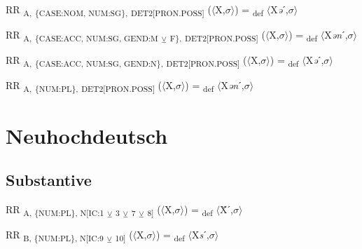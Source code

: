 {\begin{exe}
 RR \textsubscript{A,} \textsubscript{\{CASE:NOM, NUM:SG\},} \textsubscript{DET2[PRON.POSS]} ($\langle$X,$\sigma $$\rangle$) = \textsubscript{def} $\langle$X\textit{ə}ˊ,$\sigma $$\rangle$
\end{exe}

\begin{exe}
 RR \textsubscript{A,} \textsubscript{\{CASE:ACC, NUM:SG, GEND:M} \textsubscript{${\veebar}$}\textsubscript{ F\},} \textsubscript{DET2[PRON.POSS]} ($\langle$X,$\sigma $$\rangle$) = \textsubscript{def} $\langle$X\textit{ən}ˊ,$\sigma $$\rangle$
\end{exe}

\begin{exe}
 RR \textsubscript{A,} \textsubscript{\{CASE:ACC, NUM:SG, GEND:N\},} \textsubscript{DET2[PRON.POSS]} ($\langle$X,$\sigma $$\rangle$) = \textsubscript{def} $\langle$X\textit{ə}ˊ,$\sigma $$\rangle$
\end{exe}

\begin{exe}
 RR \textsubscript{A,} \textsubscript{\{NUM:PL\},} \textsubscript{DET2[PRON.POSS]} ($\langle$X,$\sigma $$\rangle$) = \textsubscript{def} $\langle$X\textit{ən}ˊ,$\sigma $$\rangle$
\end{exe}

\section{Neuhochdeutsch}

\subsection{Substantive}

\begin{exe}
 RR \textsubscript{A, \{NUM:PL\}, N[IC:1} \textsubscript{${\veebar}$}\textsubscript{ 3} \textsubscript{${\veebar}$}\textsubscript{ 7} \textsubscript{${\veebar}$}\textsubscript{ 8]} ($\langle$X,$\sigma $$\rangle$) = \textsubscript{def} $\langle$Ẍˊ,$\sigma $$\rangle$
\end{exe}

\begin{exe}
 RR \textsubscript{B, \{NUM:PL\}, N[IC:9} \textsubscript{${\veebar}$}\textsubscript{ 10]} ($\langle$X,$\sigma $$\rangle$) = \textsubscript{def} $\langle$X\textit{s}ˊ,$\sigma $$\rangle$
\end{exe}

}
